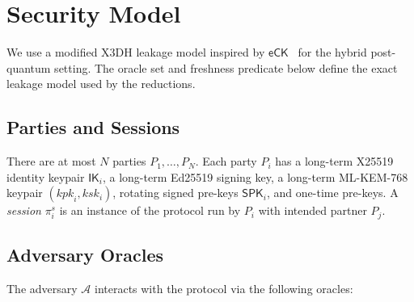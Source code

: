 \documentclass[11pt,a4paper]{article}
\theoremstyle{definition}
\theoremstyle{remark}
\newcommand{\advA}{\mathcal{A}}
\newcommand{\eCK}{\mathsf{eCK}}
\newcommand{\IK}{\mathsf{IK}}
\newcommand{\SPK}{\mathsf{SPK}}
\begin{document}
\section{Security Model}
\label{sec:model}

We use a modified X3DH leakage model inspired by $\eCK$~\cite{lamacchia2007}
for the hybrid post-quantum setting. The oracle set and freshness predicate
below define the exact leakage model used by the reductions.

\subsection{Parties and Sessions}

There are at most $N$ parties $P_1, \ldots, P_N$.  Each party $P_i$ has a
long-term X25519 identity keypair $\IK_i$, a long-term Ed25519 signing key,
a long-term ML-KEM-768 keypair $(\mathit{kpk}_i, \mathit{ksk}_i)$,
rotating signed pre-keys $\SPK_i$, and one-time pre-keys.
A \emph{session} $\pi_i^s$ is an instance of the protocol run by $P_i$ with
intended partner $P_j$.

\subsection{Adversary Oracles}

The adversary $\advA$ interacts with the protocol via the following oracles:
\end{document}
